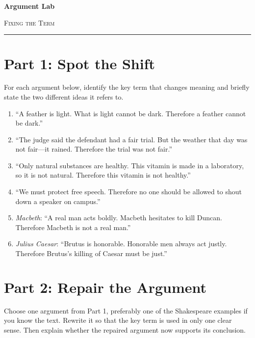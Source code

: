 \documentclass[12pt]{article}
\begin{document}
\begin{center}
{\LARGE\bfseries Argument Lab}\par\vspace{0.25em}
{\large\scshape Fixing the Term}\par\vspace{0.5em}
\rule{0.82\textwidth}{0.4pt}
\end{center}

\section*{Part 1: Spot the Shift}
For each argument below, identify the key term that changes meaning and briefly state the two different ideas it refers to.

\begin{enumerate}[leftmargin=*]
\item “A feather is light. What is light cannot be dark. Therefore a feather cannot be dark.”

\item “The judge said the defendant had a fair trial. But the weather that day was not fair—it rained. Therefore the trial was not fair.”

\item “Only natural substances are healthy. This vitamin is made in a laboratory, so it is not natural. Therefore this vitamin is not healthy.”

\item “We must protect free speech. Therefore no one should be allowed to shout down a speaker on campus.”
\item \textit{Macbeth}: “A real man acts boldly. Macbeth hesitates to kill Duncan. Therefore Macbeth is not a real man.”
\item \textit{Julius Caesar}: “Brutus is honorable. Honorable men always act justly. Therefore Brutus's killing of Caesar must be just.”
\end{enumerate}

\section*{Part 2: Repair the Argument}
Choose one argument from Part 1, preferably one of the Shakespeare examples if you know the text. Rewrite it so that the key term is used in only one clear sense. Then explain whether the repaired argument now supports its conclusion.

\vspace{4cm}
\end{document}
